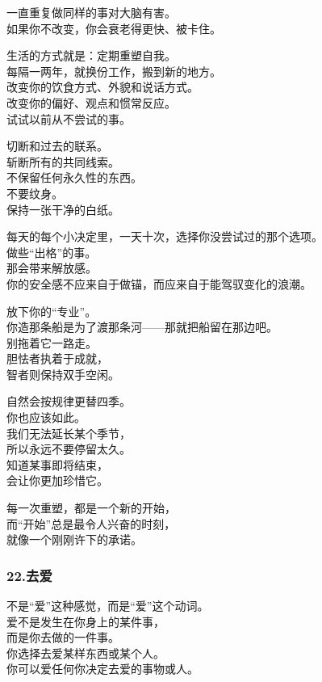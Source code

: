 \documentclass[
]{article}
\begin{document}
一直重复做同样的事对大脑有害。\\
如果你不改变，你会衰老得更快、被卡住。

生活的方式就是：定期重塑自我。\\
每隔一两年，就换份工作，搬到新的地方。\\
改变你的饮食方式、外貌和说话方式。\\
改变你的偏好、观点和惯常反应。\\
试试以前从不尝试的事。

切断和过去的联系。\\
斩断所有的共同线索。\\
不保留任何永久性的东西。\\
不要纹身。\\
保持一张干净的白纸。

每天的每个小决定里，一天十次，选择你没尝试过的那个选项。\\
做些``出格''的事。\\
那会带来解放感。\\
你的安全感不应来自于做锚，而应来自于能驾驭变化的浪潮。

放下你的``专业''。\\
你造那条船是为了渡那条河------那就把船留在那边吧。\\
别拖着它一路走。\\
胆怯者执着于成就，\\
智者则保持双手空闲。

自然会按规律更替四季。\\
你也应该如此。\\
我们无法延长某个季节，\\
所以永远不要停留太久。\\
知道某事即将结束，\\
会让你更加珍惜它。

每一次重塑，都是一个新的开始，\\
而``开始''总是最令人兴奋的时刻，\\
就像一个刚刚许下的承诺。

\subsubsection{22.去爱}\label{22ux53bbux7231}

不是``爱''这种感觉，而是``爱''这个动词。\\
爱不是发生在你身上的某件事，\\
而是你去做的一件事。\\
你选择去爱某样东西或某个人。\\
你可以爱任何你决定去爱的事物或人。
\end{document}
